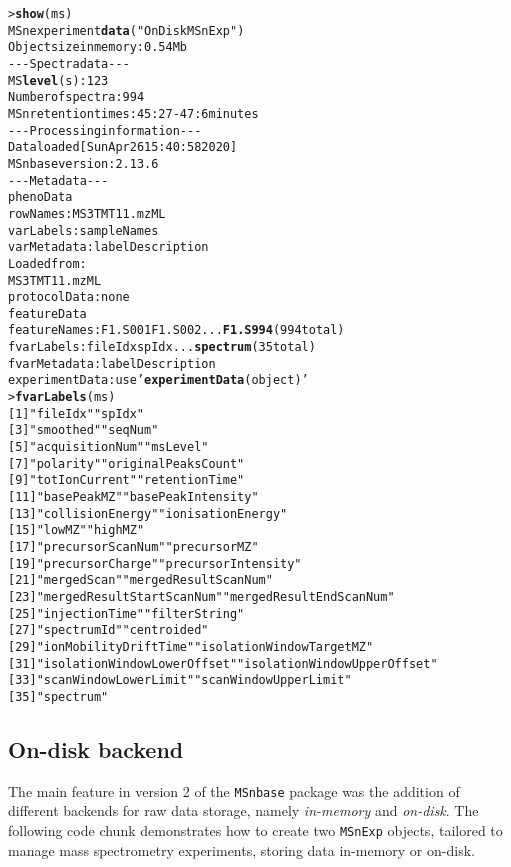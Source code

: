 \documentclass[journal=jacsat,manuscript=article]{achemso}\usepackage[]{graphicx}\usepackage[]{color}
\makeatletter
\newcommand{\hlstr}[1]{\textcolor[rgb]{0.192,0.494,0.8}{#1}}%
\newcommand{\hlkwd}[1]{\textcolor[rgb]{0.737,0.353,0.396}{\textbf{#1}}}%
\newenvironment{kframe}{%
 \def\at@end@of@kframe{}%
 \ifinner\ifhmode%
  \def\at@end@of@kframe{\end{minipage}}%
  \begin{minipage}{\columnwidth}%
 \fi\fi%
 \def\FrameCommand##1{\hskip\@totalleftmargin \hskip-\fboxsep
 \colorbox{shadecolor}{##1}\hskip-\fboxsep
     \hskip-\linewidth \hskip-\@totalleftmargin \hskip\columnwidth}%
 \MakeFramed {\advance\hsize-\width
   \@totalleftmargin\z@ \linewidth\hsize
   \@setminipage}}%
 {\par\unskip\endMakeFramed%
 \at@end@of@kframe}
\newenvironment{knitrout}{}{} %
\makeatother
\begin{document}
\begin{knitrout}
\color{fgcolor}\begin{kframe}
\begin{alltt}
> \hlkwd{show}(ms)
MSn experiment \hlkwd{data} (\hlstr{"OnDiskMSnExp"})
Object size in memory: 0.54 Mb
- - - Spectra data - - -
 MS \hlkwd{level}(s): 1 2 3 
 Number of spectra: 994 
 MSn retention times: 45:27 - 47:6 minutes
- - - Processing information - - -
Data loaded [Sun Apr 26 15:40:58 2020] 
 MSnbase version: 2.13.6 
- - - Meta data  - - -
phenoData
  rowNames: MS3TMT11.mzML
  varLabels: sampleNames
  varMetadata: labelDescription
Loaded from:
  MS3TMT11.mzML 
protocolData: none
featureData
  featureNames: F1.S001 F1.S002 ... \hlkwd{F1.S994} (994 total)
  fvarLabels: fileIdx spIdx ... \hlkwd{spectrum} (35 total)
  fvarMetadata: labelDescription
experimentData: use \hlstr{'\hlkwd{experimentData}(object)'}
> \hlkwd{fvarLabels}(ms)
 [1] \hlstr{"fileIdx"}                    \hlstr{"spIdx"}
 [3] \hlstr{"smoothed"}                   \hlstr{"seqNum"}
 [5] \hlstr{"acquisitionNum"}             \hlstr{"msLevel"}
 [7] \hlstr{"polarity"}                   \hlstr{"originalPeaksCount"}
 [9] \hlstr{"totIonCurrent"}              \hlstr{"retentionTime"}
[11] \hlstr{"basePeakMZ"}                 \hlstr{"basePeakIntensity"}
[13] \hlstr{"collisionEnergy"}            \hlstr{"ionisationEnergy"}
[15] \hlstr{"lowMZ"}                      \hlstr{"highMZ"}
[17] \hlstr{"precursorScanNum"}           \hlstr{"precursorMZ"}
[19] \hlstr{"precursorCharge"}            \hlstr{"precursorIntensity"}
[21] \hlstr{"mergedScan"}                 \hlstr{"mergedResultScanNum"}
[23] \hlstr{"mergedResultStartScanNum"}   \hlstr{"mergedResultEndScanNum"}
[25] \hlstr{"injectionTime"}              \hlstr{"filterString"}
[27] \hlstr{"spectrumId"}                 \hlstr{"centroided"}
[29] \hlstr{"ionMobilityDriftTime"}       \hlstr{"isolationWindowTargetMZ"}
[31] \hlstr{"isolationWindowLowerOffset"} \hlstr{"isolationWindowUpperOffset"}
[33] \hlstr{"scanWindowLowerLimit"}       \hlstr{"scanWindowUpperLimit"}
[35] \hlstr{"spectrum"}
\end{alltt}
\end{kframe}
\end{knitrout}

\subsection{On-disk backend}

The main feature in version 2 of the \texttt{MSnbase} package was the
addition of different backends for raw data storage, namely
\textit{in-memory} and \textit{on-disk}. The following code chunk
demonstrates how to create two \texttt{MSnExp} objects, tailored to
manage mass spectrometry experiments, storing data in-memory or
on-disk.
\end{document}
